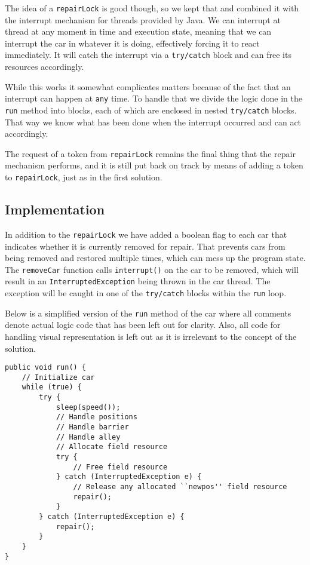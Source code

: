 The idea of a \texttt{repairLock} is good though, so we kept that and combined it with the interrupt mechanism for threads provided by Java. We can interrupt at thread at any moment in time and execution state, meaning that we can interrupt the car in whatever it is doing, effectively forcing it to react immediately. It will catch the interrupt via a \texttt{try/catch} block and can free its resources accordingly.

While this works it somewhat complicates matters because of the fact that an interrupt can happen at \texttt{any} time. To handle that we divide the logic done in the \texttt{run} method into blocks, each of which are enclosed in nested \texttt{try/catch} blocks. That way we know what has been done when the interrupt occurred and can act accordingly.

The request of a token from \texttt{repairLock} remains the final thing that the repair mechanism performs, and it is still put back on track by means of adding a token to \texttt{repairLock}, just as in the first solution.

\subsection*{Implementation}
In addition to the \texttt{repairLock} we have added a boolean flag to each car that indicates whether it is currently removed for repair. That prevents cars from being removed and restored multiple times, which can mess up the program state. The \texttt{removeCar} function calls \texttt{interrupt()} on the car to be removed, which will result in an \texttt{InterruptedException} being thrown in the car thread. The exception will be caught in one of the \texttt{try/catch} blocks within the \texttt{run} loop.

Below is a simplified version of the \texttt{run} method of the car where all comments denote actual logic code that has been left out for clarity. Also, all code for handling visual representation is left out as it is irrelevant to the concept of the solution.

\begin{lstlisting}
public void run() {
	// Initialize car
	while (true) {
		try {
			sleep(speed());
			// Handle positions
			// Handle barrier
			// Handle alley
			// Allocate field resource
			try {
				// Free field resource
			} catch (InterruptedException e) {
				// Release any allocated ``newpos'' field resource
				repair();
			}
		} catch (InterruptedException e) {
			repair();
		}
	}
}
\end{lstlisting}

